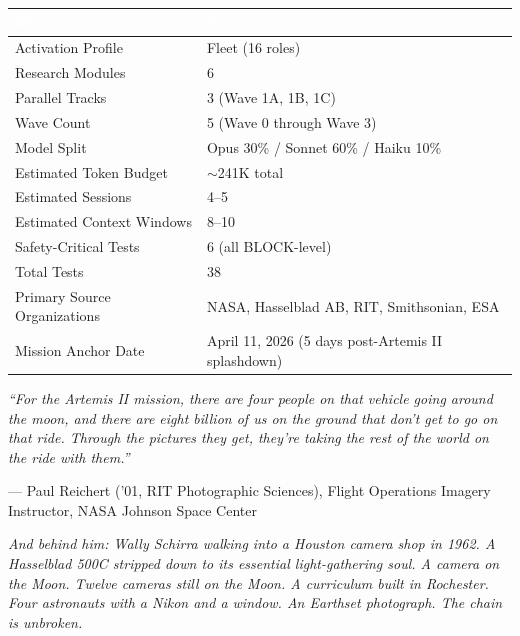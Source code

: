 \documentclass[11pt,letterpaper]{article}
\newcommand{\tableheader}[1]{\textbf{\sffamily\textcolor{white}{#1}}}
\begin{document}
\begin{center}
\begin{tabularx}{\textwidth}{L{5cm}X}
\toprule
{}
\tableheader{Metric} & \tableheader{Value} \\
\midrule
Activation Profile & Fleet (16 roles) \\
Research Modules & 6 \\
Parallel Tracks & 3 (Wave 1A, 1B, 1C) \\
Wave Count & 5 (Wave 0 through Wave 3) \\
Model Split & Opus 30\% / Sonnet 60\% / Haiku 10\% \\
Estimated Token Budget & $\sim$241K total \\
Estimated Sessions & 4--5 \\
Estimated Context Windows & 8--10 \\
Safety-Critical Tests & 6 (all BLOCK-level) \\
Total Tests & 38 \\
Primary Source Organizations & NASA, Hasselblad AB, RIT, Smithsonian, ESA \\
Mission Anchor Date & April 11, 2026 (5 days post-Artemis II splashdown) \\
\bottomrule
\end{tabularx}
\end{center}

\vspace{2em}

\begin{quotebox}
\textit{``For the Artemis II mission, there are four people on that vehicle going around the moon, and there are eight billion of us on the ground that don't get to go on that ride. Through the pictures they get, they're taking the rest of the world on the ride with them.''}

\vspace{0.5em}
--- Paul Reichert ('01, RIT Photographic Sciences), Flight Operations Imagery Instructor, NASA Johnson Space Center

\vspace{0.8em}
\textit{And behind him: Wally Schirra walking into a Houston camera shop in 1962. A Hasselblad 500C stripped down to its essential light-gathering soul. A camera on the Moon. Twelve cameras still on the Moon. A curriculum built in Rochester. Four astronauts with a Nikon and a window. An Earthset photograph. The chain is unbroken.}
\end{quotebox}
\end{document}

